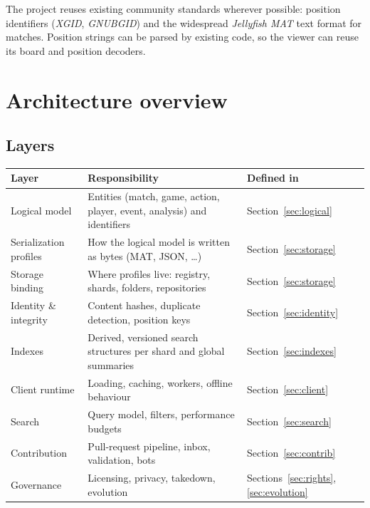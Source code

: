 \documentclass[11pt,a4paper]{article}
\newcommand{\kw}[1]{\textit{#1}\index{#1}}
\begin{document}
The project reuses existing community standards wherever possible: position identifiers (\kw{XGID}, \kw{GNUBGID}) and the widespread \kw{Jellyfish MAT} text format for matches. Position strings can be parsed by existing code, so the viewer can reuse its board and position decoders.

\section{Architecture overview}

\subsection{Layers}
\begin{longtable}{@{}p{2.8cm}p{4.2cm}p{7.3cm}@{}}
\toprule
\textbf{Layer} & \textbf{Responsibility} & \textbf{Defined in}\\
\midrule
\endhead
Logical model & Entities (match, game, action, player, event, analysis) and identifiers & Section~\ref{sec:logical}\\
Serialization profiles & How the logical model is written as bytes (MAT, JSON, \ldots) & Section~\ref{sec:storage}\\
Storage binding & Where profiles live: registry, shards, folders, repositories & Section~\ref{sec:storage}\\
Identity \& integrity & Content hashes, duplicate detection, position keys & Section~\ref{sec:identity}\\
Indexes & Derived, versioned search structures per shard and global summaries & Section~\ref{sec:indexes}\\
Client runtime & Loading, caching, workers, offline behaviour & Section~\ref{sec:client}\\
Search & Query model, filters, performance budgets & Section~\ref{sec:search}\\
Contribution & Pull-request pipeline, inbox, validation, bots & Section~\ref{sec:contrib}\\
Governance & Licensing, privacy, takedown, evolution & Sections~\ref{sec:rights}, \ref{sec:evolution}\\
\bottomrule
\end{longtable}
\end{document}
